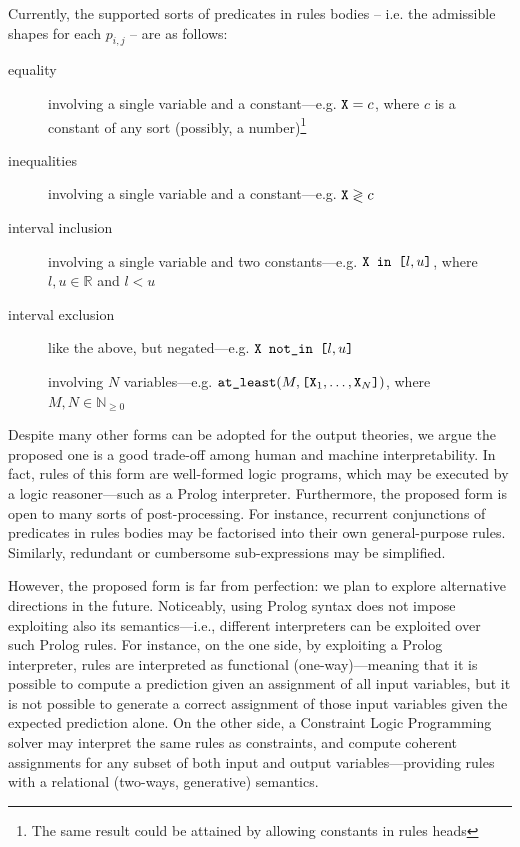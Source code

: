 \documentclass[12pt,a4paper,openright,twoside]{book}
\begin{document}
Currently, the supported sorts of predicates in rules bodies -- i.e. the admissible shapes for each $p_{i,j}$ -- are as follows:
%
\begin{description}
    \item[equality] involving a single variable and a constant---e.g. $\texttt{X} = c$, where $c$ is a constant of any sort (possibly, a number)\footnote{The same result could be attained by allowing constants in rules heads}
    \item[inequalities] involving a single variable and a constant---e.g. $\texttt{X} \gtrless c$
    \item[interval inclusion] involving a single variable and two constants---e.g. $\texttt{X} \texttt{ in [}l, u\texttt{]}$, where $l,u \in \mathbb{R}$ and $l < u$
    \item[interval exclusion] like the above, but negated---e.g. $\texttt{X} \texttt{ not\_in [}l, u\texttt{]}$
    \item[\mofn{}] involving $N$ variables---e.g. $\texttt{at\_least}(M, \texttt{[} \texttt{X}_1, \ldots, \texttt{X}_N \texttt{]})$, where $M, N \in \mathbb{N}_{\geq 0}$
\end{description}
%
Despite many other forms can be adopted for the output theories, we argue the proposed one is a good trade-off among human and machine interpretability.
%
In fact, rules of this form are well-formed logic programs, which may be executed by a logic reasoner---such as a Prolog interpreter.
%
Furthermore, the proposed form is open to many sorts of post-processing.
%
For instance, recurrent conjunctions of predicates in rules bodies may be factorised into their own general-purpose rules.
%
Similarly, redundant or cumbersome sub-expressions may be simplified.

However, the proposed form is far from perfection: we plan to explore alternative directions in the future.
%
Noticeably, using Prolog syntax does not impose exploiting also its semantics---i.e., different interpreters can be exploited over such Prolog rules.
%
For instance, on the one side, by exploiting a Prolog interpreter, rules are interpreted as functional (one-way)---meaning that it is possible to compute a prediction given an assignment of all input variables, but it is not possible to generate a correct assignment of those input variables given the expected prediction alone.
%
On the other side, a Constraint Logic Programming solver \cite{GavanelliR10,JaffarM94} may interpret the same rules as constraints, and compute coherent assignments for any subset of both input and output variables---providing rules with a relational (two-ways, generative) semantics.
\end{document}
